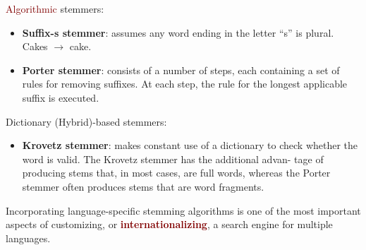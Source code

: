 \begin{minipage}{.5\textwidth}
\textcolor{Maroon}{Algorithmic} stemmers:
\begin{itemize}
    \setlength\itemsep{0em}
    \item \textbf{Suffix-s stemmer}: assumes any word ending in the letter “s” is plural. Cakes $\rightarrow$ cake.
    \item \textbf{Porter stemmer}: consists of a number of steps, each containing a set of rules for removing suffixes. At each step, the rule for the longest applicable suffix is executed. 
\end{itemize}
\end{minipage}
\begin{minipage}{.5\textwidth}
\textcolor{NavyBlue}{Dictionary (Hybrid)}-based stemmers:
\begin{itemize}
    \setlength\itemsep{0em}
    \item \textbf{Krovetz stemmer}: makes constant use of a dictionary to check whether the word is valid. The Krovetz stemmer has the additional advan- tage of producing stems that, in most cases, are full words, whereas the Porter stemmer often produces stems that are word fragments.
\end{itemize}
\end{minipage}
\vspace{0.25cm}

Incorporating language-specific stemming algorithms is one of the most important aspects of customizing, or \textbf{\textcolor{Maroon}{internationalizing}}, a search engine for multiple languages.


